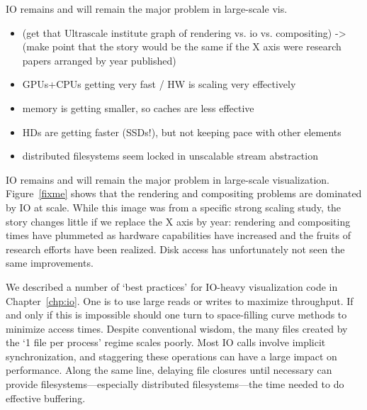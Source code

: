



IO remains and will remain the major problem in large-scale vis.
\begin{itemize}
	\item (get that Ultrascale institute graph of rendering vs. io vs. compositing)
	-> (make point that the story would be the same if the X axis were research
	    papers arranged by year published)
	\item GPUs+CPUs getting very fast / HW is scaling very effectively
	\item memory is getting smaller, so caches are less effective
	\item HDs are getting faster (SSDs!), but not keeping pace with other elements
	\item distributed filesystems seem locked in unscalable stream abstraction
\end{itemize}

IO remains and will remain the major problem in large-scale
visualization.  Figure~\ref{fixme} shows that the rendering and
compositing problems are dominated by IO at scale.  While this image
was from a specific strong scaling study, the story changes little if
we replace the X axis by year: rendering and compositing times have
plummeted as hardware capabilities have increased and the fruits of
research efforts have been realized.  Disk access has unfortunately not
seen the same improvements.

We described a number of `best practices' for IO-heavy visualization
code in Chapter~\ref{chp:io}.  One is to use large reads or writes to
maximize throughput.  If and only if this is impossible should one
turn to space-filling curve methods to minimize access times.  Despite
conventional wisdom, the many files created by the `1 file per process'
regime scales poorly.  Most IO calls involve implicit synchronization,
and staggering these operations can have a large impact on performance.
Along the same line, delaying file closures until necessary can provide
filesystems---especially distributed filesystems---the time needed to
do effective buffering.

